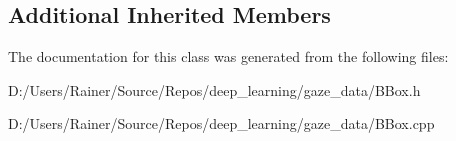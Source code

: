 \subsection*{Additional Inherited Members}


The documentation for this class was generated from the following files\+:\begin{DoxyCompactItemize}
\item 
D\+:/\+Users/\+Rainer/\+Source/\+Repos/deep\+\_\+learning/gaze\+\_\+data/B\+Box.\+h\item 
D\+:/\+Users/\+Rainer/\+Source/\+Repos/deep\+\_\+learning/gaze\+\_\+data/B\+Box.\+cpp\end{DoxyCompactItemize}

